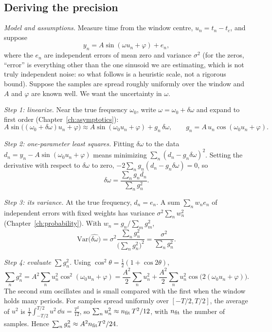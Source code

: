 \subsection{Deriving the precision}

\emph{Model and assumptions.} Measure time from the window centre, $u_n=t_n-t_c$, and suppose
\begin{equation}
y_n=A\sin(\omega u_n+\varphi)+e_n ,
\end{equation}
where the $e_n$ are independent errors of mean zero and variance $\sigma^2$ (for the zeros, ``error'' is everything other than the one sinusoid we are estimating, which is not truly independent noise: so what follows is a heuristic scale, not a rigorous bound). Suppose the samples are spread roughly uniformly over the window and $A$ and $\varphi$ are known well. We want the uncertainty in $\omega$.

\emph{Step 1: linearize.} Near the true frequency $\omega_0$, write $\omega=\omega_0+\delta\omega$ and expand to first order (Chapter~\ref{ch:asymptotics}):
\begin{equation}
A\sin\bigl((\omega_0+\delta\omega)u_n+\varphi\bigr)\approx A\sin(\omega_0u_n+\varphi)+g_n\,\delta\omega,
\qquad g_n=A\,u_n\cos(\omega_0u_n+\varphi).
\end{equation}

\emph{Step 2: one-parameter least squares.} Fitting $\delta\omega$ to the data $d_n=y_n-A\sin(\omega_0u_n+\varphi)$ means minimizing $\sum_n(d_n-g_n\delta\omega)^2$. Setting the derivative with respect to $\delta\omega$ to zero, $-2\sum_ng_n(d_n-g_n\delta\omega)=0$, so
\begin{equation}
\widehat{\delta\omega}=\frac{\sum_ng_nd_n}{\sum_ng_n^2}.
\end{equation}

\emph{Step 3: its variance.} At the true frequency, $d_n=e_n$. A sum $\sum_n w_ne_n$ of independent errors with fixed weights has variance $\sigma^2\sum_nw_n^2$ (Chapter~\ref{ch:probability}). With $w_n=g_n/\sum_mg_m^2$,
\begin{equation}
\mathrm{Var}\bigl(\widehat{\delta\omega}\bigr)=\sigma^2\frac{\sum_ng_n^2}{\bigl(\sum_ng_n^2\bigr)^2}=\frac{\sigma^2}{\sum_ng_n^2}.
\end{equation}

\emph{Step 4: evaluate $\sum g_n^2$.} Using $\cos^2\theta=\tfrac12(1+\cos2\theta)$,
\begin{equation}
\sum_ng_n^2=A^2\sum_nu_n^2\cos^2(\omega_0u_n+\varphi)=\frac{A^2}{2}\sum_nu_n^2+\frac{A^2}2\sum_nu_n^2\cos\bigl(2(\omega_0u_n+\varphi)\bigr).
\end{equation}
The second sum oscillates and is small compared with the first when the window holds many periods. For samples spread uniformly over $[-T/2,T/2]$, the average of $u^2$ is $\frac1T\int_{-T/2}^{T/2}u^2\,\dd u=\frac{T^2}{12}$, so $\sum_nu_n^2\approx n_{\rm fit}\,T^2/12$, with $n_{\rm fit}$ the number of samples. Hence $\sum_ng_n^2\approx A^2n_{\rm fit}T^2/24$.

